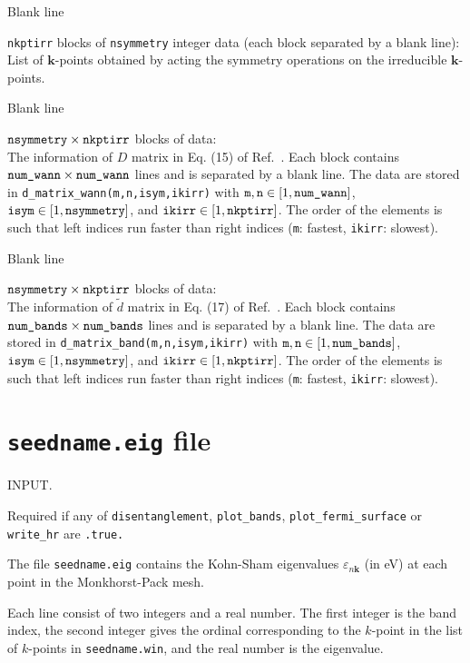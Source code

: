 Blank line 

\verb#nkptirr# blocks of  \verb#nsymmetry# integer data (each block separated by a blank line): 
List of ${\mathbf k}$-points obtained by acting the symmetry operations on the irreducible ${\mathbf k}$-points. 

Blank line 

$\verb#nsymmetry# \times \verb#nkptirr# $ blocks of data: \\
The information of $D$ matrix in Eq. (15) of Ref.~\cite{sakuma-prb13}. 
Each block contains $\verb#num_wann# \times \verb#num_wann#$ lines and is separated by a blank line. 
The data are stored in  \verb#d_matrix_wann(m,n,isym,ikirr)# with 
$\verb#m#, \verb#n# \in [1,\verb#num_wann#]$, $\verb#isym# \in [1,\verb#nsymmetry#]$, and $\verb#ikirr# \in [1,\verb#nkptirr#]$. 
The order of the elements is such that left indices run faster than right indices (\verb#m#: fastest,  \verb#ikirr#: slowest).
 
Blank line 

$\verb#nsymmetry# \times \verb#nkptirr# $ blocks of data: \\
The information of $\tilde d$ matrix in Eq. (17) of Ref.~\cite{sakuma-prb13}. 
Each block contains $\verb#num_bands# \times \verb#num_bands#$ lines and is separated by a blank line.
The data are stored in  \verb#d_matrix_band(m,n,isym,ikirr)# with 
$\verb#m#, \verb#n# \in [1,\verb#num_bands#]$, $\verb#isym# \in [1,\verb#nsymmetry#]$, and $\verb#ikirr# \in [1,\verb#nkptirr#]$. 
The order of the elements is such that left indices run faster than right indices (\verb#m#: fastest,  \verb#ikirr#: slowest). 


\section{{\tt seedname.eig} file}

INPUT. 

Required if any of \verb#disentanglement#, \verb#plot_bands#,
   \verb#plot_fermi_surface# or \verb#write_hr# are \verb#.true.#

The file \verb#seedname.eig# contains the Kohn-Sham eigenvalues
     $\varepsilon_{n\mathbf{k}}$ (in eV) at each point in the
     Monkhorst-Pack mesh.

Each line consist of two integers and a real number. The first integer
is the band index, the second integer gives the ordinal corresponding
to the $k$-point in the list of $k$-points in \verb#seedname.win#,
and the real number is the eigenvalue. 

